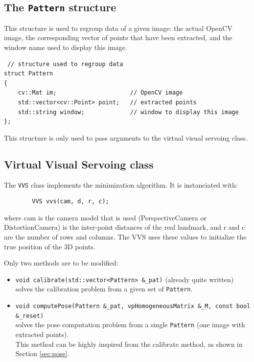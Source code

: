 \documentclass{ecnreport}
\begin{document}
 \subsection{The \texttt{Pattern} structure}
 
 This structure is used to regroup data of a given image: the actual OpenCV image, the corresponding vector of points that have been extracted, and the window name used to display this image.
 
  \begin{center}\cppstyle
\begin{lstlisting}
 // structure used to regroup data
struct Pattern
{
    cv::Mat im;                     // OpenCV image
    std::vector<cv::Point> point;   // extracted points
    std::string window;             // window to display this image
};\end{lstlisting}
\end{center}This structure is only used to pass arguments to the virtual visual servoing class.


 \subsection{Virtual Visual Servoing class}
 
 The \texttt{VVS} class implements the minimization algorithm. It is instanciated with:
 \begin{center}\cppstyle
\begin{lstlisting}
        VVS vvs(cam, d, r, c);
\end{lstlisting}
\end{center}where cam is the camera model that is used (PerspectiveCamera or DistortionCamera) is the inter-point distances of the real landmark, and r and c are the number of rows and columns. The VVS uses these values to initialize the true position of the 3D points.

Only two methods are to be modified:
\begin{itemize}
    \item \texttt{void calibrate(std::vector<Pattern> \&\_pat)} (already quite written)\\ solves the calibration problem from a given set of \texttt{Pattern}. 
    \item \texttt{void computePose(Pattern \&\_pat, vpHomogeneousMatrix \&\_M, const bool \&\_reset)} \\ 
    solves the pose computation problem from a single \texttt{Pattern} (one image with extracted points).\\ This method can be highly inspired from the calibrate method, as shown in Section \ref{sec:pose}.
\end{itemize}
\end{document}
